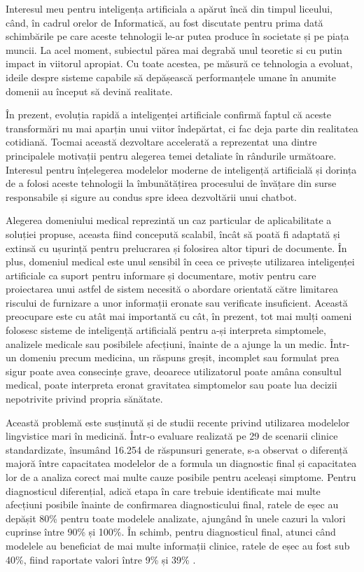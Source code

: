 \documentclass[12pt, a4paper, oneside, romanian]{teza-upb}
\begin{document}
Interesul meu pentru inteligența artificiala a apărut încă din timpul liceului, când, în cadrul orelor de Informatică, au fost discutate pentru prima dată schimbările pe care aceste tehnologii le-ar putea produce în societate și pe piața muncii. La acel moment, subiectul părea mai degrabă unul teoretic si cu putin impact in viitorul apropiat. Cu toate acestea, pe măsură ce tehnologia a evoluat, ideile despre sisteme capabile să depășească performanțele umane în anumite domenii au început să devină realitate.

În prezent, evoluția rapidă a inteligenței artificiale confirmă faptul că aceste transformări nu mai aparțin unui viitor îndepărtat, ci fac deja parte din realitatea cotidiană. Tocmai această dezvoltare accelerată a reprezentat una dintre principalele motivații pentru alegerea temei detaliate în rândurile următoare. Interesul pentru înțelegerea modelelor moderne de inteligență artificială și dorința de a folosi aceste tehnologii la îmbunătățirea procesului de învățare din surse responsabile și sigure au condus spre ideea dezvoltării unui chatbot.

Alegerea domeniului medical reprezintă un caz particular de aplicabilitate a soluției propuse, aceasta fiind concepută scalabil, încât să poată fi adaptată și extinsă cu ușurință pentru prelucrarea și folosirea altor tipuri de documente. În plus, domeniul medical este unul sensibil în ceea ce privește utilizarea inteligenței artificiale ca suport pentru informare și documentare, motiv pentru care proiectarea unui astfel de sistem necesită o abordare orientată către limitarea riscului de furnizare a unor informații eronate sau verificate insuficient.
Această preocupare este cu atât mai importantă cu cât, în prezent, tot mai mulți oameni folosesc sisteme de inteligență artificială pentru a-și interpreta simptomele, analizele medicale sau posibilele afecțiuni, înainte de a ajunge la un medic. Într-un domeniu precum medicina, un răspuns greșit, incomplet sau formulat prea sigur poate avea consecințe grave, deoarece utilizatorul poate amâna consultul medical, poate interpreta eronat gravitatea simptomelor sau poate lua decizii nepotrivite privind propria sănătate.


Această problemă este susținută și de studii recente privind utilizarea modelelor lingvistice mari în medicină. Într-o evaluare realizată pe 29 de scenarii clinice standardizate, însumând 16.254 de răspunsuri generate, s-a observat o diferență majoră între capacitatea modelelor de a formula un diagnostic final și capacitatea lor de a analiza corect mai multe cauze posibile pentru aceleași simptome. Pentru diagnosticul diferențial, adică etapa în care trebuie identificate mai multe afecțiuni posibile înainte de confirmarea diagnosticului final, ratele de eșec au depășit 80\% pentru toate modelele analizate, ajungând în unele cazuri la valori cuprinse între 90\% și 100\%. În schimb, pentru diagnosticul final, atunci când modelele au beneficiat de mai multe informații clinice, ratele de eșec au fost sub 40\%, fiind raportate valori între 9\% și 39\% \cite{rao2026llm}.
\end{document}

